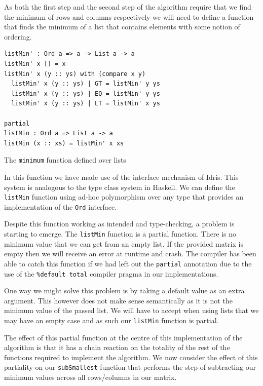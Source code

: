 \documentclass[a4paper, notitlepage]{report}
\begin{document}
As both the first step and the second step of the algorithm require that we find
the minimum of rows and columns respectively we will need to define a function
that finds the minimum of a list that contains elements with some notion of ordering.

\begin{listing}[H]
\begin{verbatim}
listMin' : Ord a => a -> List a -> a
listMin' x [] = x
listMin' x (y :: ys) with (compare x y)
  listMin' x (y :: ys) | GT = listMin' y ys
  listMin' x (y :: ys) | EQ = listMin' y ys
  listMin' x (y :: ys) | LT = listMin' x ys

partial
listMin : Ord a => List a -> a
listMin (x :: xs) = listMin' x xs
\end{verbatim}
\caption{The \texttt{minimum} function defined over lists}
\end{listing}

In this function we have made use of the interface mechanism of Idris. This
system is analogous to the type class system in Haskell. We can define the
\texttt{listMin} function using ad-hoc polymorphism over any type that provides an
implementation of the \texttt{Ord} interface.

Despite this function working as intended and type-checking, a problem is
starting to emerge. The \texttt{listMin} function is a partial function. There is no
minimum value that we can get from an empty list. If the provided matrix is
empty then we will receive an error at runtime and crash. The compiler has been
able to catch this function if we had left out the \texttt{partial} annotation due to the
use of the \texttt{\%default total} compiler pragma in our implementations.

One way we might solve this problem is by taking a default value as an extra
argument. This however does not make sense semantically as it is not the minimum
value of the passed list. We will have to accept when using lists that we may
have an empty case and as such our \texttt{listMin} function is partial.

The effect of this partial function at the centre of this implementation of the
algorithm is that it has a chain reaction on the totality of the rest of the
functions required to implement the algorithm. We now consider the effect of
this partiality on our \texttt{subSmallest} function that performs the step of
subtracting our minimum values across all rows/columns in our matrix.
\end{document}
